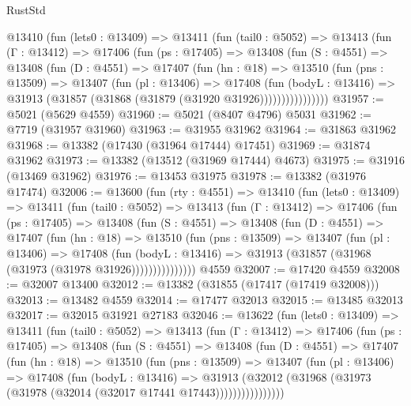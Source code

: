 \begin{lexlean}{RustStd}
\begin{coremodule}
      @13410
        (fun (lets0 : @13409) =>
        @13411
          (fun (tail0 : @5052) =>
          @13413
            (fun (Γ : @13412) =>
            @17406
              (fun (ps : @17405) =>
              @13408
                (fun (S : @4551) =>
                @13408
                  (fun (D : @4551) =>
                  @17407
                    (fun (hn : @18) =>
                    @13510
                      (fun (pns : @13509) =>
                      @13407
                        (fun (pl : @13406) =>
                        @17408
                          (fun (bodyL : @13416) =>
                          @31913 (@31857 (@31868 (@31879 (@31920 @31926))))))))))))))))
@31957 := @5021 (@5629 @4559)
@31960 := @5021 (@8407 @4796) @5031
@31962 := @7719 (@31957 @31960)
@31963 := @31955 @31962
@31964 := @31863 @31962
@31968 := @13382 (@17430 (@31964 @17444) @17451)
@31969 := @31874 @31962
@31973 := @13382 (@13512 (@31969 @17444) @4673)
@31975 := @31916 (@13469 @31962)
@31976 := @13453 @31975
@31978 := @13382 (@31976 @17474)
@32006 := @13600
    (fun (rty : @4551) =>
    @13410
      (fun (lets0 : @13409) =>
      @13411
        (fun (tail0 : @5052) =>
        @13413
          (fun (Γ : @13412) =>
          @17406
            (fun (ps : @17405) =>
            @13408
              (fun (S : @4551) =>
              @13408
                (fun (D : @4551) =>
                @17407
                  (fun (hn : @18) =>
                  @13510
                    (fun (pns : @13509) =>
                    @13407
                      (fun (pl : @13406) =>
                      @17408
                        (fun (bodyL : @13416) =>
                        @31913 (@31857 (@31968 (@31973 (@31978 @31926)))))))))))))))
    @4559
@32007 := @17420 @4559
@32008 := @32007 @13400
@32012 := @13382 (@31855 (@17417 (@17419 @32008)))
@32013 := @13482 @4559
@32014 := @17477 @32013
@32015 := @13485 @32013
@32017 := @32015 @31921 @27183
@32046 := @13622
    (fun (lets0 : @13409) =>
    @13411
      (fun (tail0 : @5052) =>
      @13413
        (fun (Γ : @13412) =>
        @17406
          (fun (ps : @17405) =>
          @13408
            (fun (S : @4551) =>
            @13408
              (fun (D : @4551) =>
              @17407
                (fun (hn : @18) =>
                @13510
                  (fun (pns : @13509) =>
                  @13407
                    (fun (pl : @13406) =>
                    @17408
                      (fun (bodyL : @13416) =>
                      @31913
                        (@32012
                          (@31968 (@31973 (@31978 (@32014 (@32017 @17441 @17443))))))))))))))))

\end{coremodule}
\end{lexlean}
